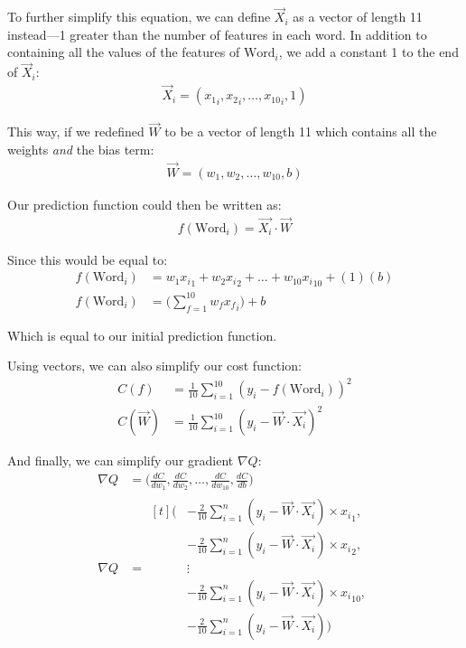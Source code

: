 \documentclass[12pt]{article}
\begin{document}
To further simplify this equation, we can define $\vec{X}_i$ as a vector of length 11 instead—1 greater than the number of features in each word. In addition to containing all the values of the features of $\text{Word}_i$, we add a constant 1 to the end of $\vec{X}_i$:
\begin{align*}
	\vec{X}_i = ({x_1}_i, {x_2}_i, \dots, {x_{10}}_i, 1)
\end{align*}

This way, if we redefined $\vec{W}$ to be a vector of length 11 which contains all the weights \textit{and} the bias term:
\begin{align*}
	\vec{W} = (w_1, w_2, \dots, w_{10}, b)
\end{align*}

Our prediction function could then be written as:
\begin{align*}
	f(\text{Word}_i) = \vec{X_i} \cdot \vec{W}
\end{align*}

Since this would be equal to:
\begin{align*}
	f(\text{Word}_i) & = w_1{x_i}_1 + w_2{x_i}_2 + \dots + w_{10}{x_i}_{10} + (1)(b)
	\\
	f(\text{Word}_i) & = \Big(\sum_{f=1}^{10} w_f{x_f}_i\Big) + b
\end{align*}

Which is equal to our initial prediction function.

\bigskip

Using vectors, we can also simplify our cost function:
\begin{align*}
	C(f)       & = \frac{1}{10} \sum_{i=1}^{10} (y_i - f(\text{Word}_i))^2
	\\
	C(\vec{W}) & = \frac{1}{10} \sum_{i=1}^{10} (y_i - \vec{W} \cdot \vec{X_i})^2
\end{align*}

And finally, we can simplify our gradient $\nabla Q$:
\begin{align*}
	\nabla Q & = \Big(\frac{dC}{dw_1}, \frac{dC}{dw_2}, \dots, \frac{dC}{dw_{10}}, \frac{dC}{db}\Big)
	\\
	\nabla Q & =
	\begin{aligned}[t]
		\Big(
		 & -\frac{2}{10} \sum_{i=1}^{n} (y_i - \vec{W} \cdot \vec{X_i}) \times {x_i}_1,
		\\
		 & -\frac{2}{10} \sum_{i=1}^{n} (y_i - \vec{W} \cdot \vec{X_i}) \times {x_i}_2,
		\\
		 & \vdots
		\\
		 & -\frac{2}{10} \sum_{i=1}^{n} (y_i - \vec{W} \cdot \vec{X_i}) \times {x_i}_{10},
		\\
		 & -\frac{2}{10} \sum_{i=1}^{n} (y_i - \vec{W} \cdot \vec{X_i})
		\Big)
	\end{aligned}
\end{align*}
\end{document}
